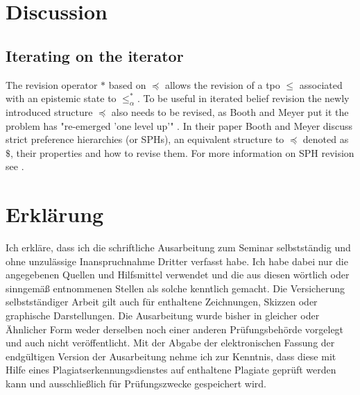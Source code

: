\documentclass[english, 12pt]{scrartcl}
\theoremstyle{definition}
\theoremstyle{definition}
\theoremstyle{definition}
\begin{document}

\section{Discussion}
\subsection{Iterating on the iterator}
The revision operator $\ast$ based on $\preceq$ allows the revision of a tpo $\leq$ associated with an epistemic state to $\leq_{\alpha}^{\ast}$. To be useful in iterated belief revision the newly introduced structure $\preceq$ also needs to be revised, as Booth and Meyer put it the problem has "re-emerged 'one level up'" \cite{Booth2011}. In their paper Booth and Meyer discuss strict preference hierarchies (or SPHs), an equivalent structure to $\preceq$ denoted as $\$$, their properties and how to revise them. For more information on SPH revision see \cite{Booth2011}.

\newpage

\typeout{}



\newpage

\section*{Erklärung}
Ich erkläre, dass ich die schriftliche Ausarbeitung zum Seminar selbstständig und ohne unzulässige Inanspruchnahme Dritter verfasst habe. Ich habe dabei nur die angegebenen Quellen und Hilfsmittel verwendet und die aus diesen wörtlich oder sinngemäß entnommenen Stellen als solche kenntlich gemacht. Die Versicherung selbstständiger Arbeit gilt auch für enthaltene Zeichnungen, Skizzen oder graphische Darstellungen. Die Ausarbeitung wurde bisher in gleicher oder Ähnlicher Form weder derselben noch einer anderen Prüfungsbehörde vorgelegt und auch nicht veröffentlicht. Mit der Abgabe der elektronischen Fassung der endgültigen Version der Ausarbeitung nehme ich zur Kenntnis, dass diese mit Hilfe eines Plagiatserkennungsdienstes auf enthaltene Plagiate geprüft werden kann und ausschließlich für Prüfungszwecke gespeichert wird.
\end{document}
